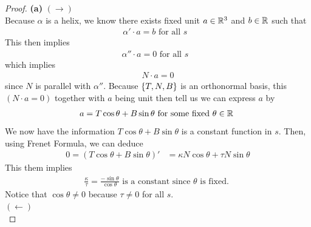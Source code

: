 \documentclass{report}
\begin{document}
\begin{proof}
\textbf{(a)}
$(\longrightarrow)$\\

Because $\alpha $ is a helix, we know there exists fixed unit $a \in\mathbb{R}^3$ and $b \in\mathbb{R}$ such that 
\begin{align*}
\alpha '  \cdot a =b \text{ for all $s$ }
\end{align*}
This then implies 
\begin{align*}
\alpha '' \cdot a = 0\text{ for all $s$ }
\end{align*}
which implies 
\begin{align*}
N\cdot a =0
\end{align*}
since $N$ is parallel with  $\alpha ''$. Because $\{ T,N,B \}$ is an orthonormal basis, this $(N\cdot a =0)$ together with $a$ being unit then tell us we can express $a$ by
\begin{align*}
a= T \cos \theta + B \sin \theta \text{ for some fixed $\theta \in\mathbb{R}$ }
\end{align*}
We now have the information $T \cos \theta + B \sin \theta$ is a constant function  in $s$. Then, using Frenet Formula, we can deduce 
\begin{align*}
  0=(T \cos \theta + B \sin \theta)'&= \kappa N \cos \theta + \tau N \sin \theta
\end{align*}
This them implies 
\begin{align*}
\frac{\kappa}{\tau}=\frac{-\sin \theta}{\cos \theta}\text{ is a constant since $\theta $ is fixed. }
\end{align*}
Notice that $\cos \theta \neq 0$ because $\tau \neq 0$ for all $s$.\\

$(\longleftarrow)$\\


\end{proof}
\end{document}
